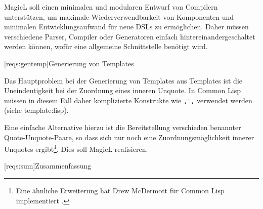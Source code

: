 \documentclass[12pt, a4paper, bibgerm]{scrbook}
\newcommand\icode[1]{\lstinline?#1?}
\newcommand\lsection{}
\newcommand\sref{}
\newcommand{\sees}[1]{(siehe \sref{#1})}
\begin{document}
MagicL soll einen minimalen und modularen Entwurf von Compilern
unterstützen, um maximale Wiederverwendbarkeit von Komponenten und
minimalen Entwicklungsaufwand für neue DSLs zu ermöglichen. Daher müssen
verschiedene Parser, Compiler oder Generatoren einfach
hintereinandergeschaltet werden können, wofür eine allgemeine
Schnittstelle benötigt wird.

\lsection[reqs:gentemp]{Generierung von Templates}

Das Hauptproblem bei der Generierung von Templates aus Templates ist die
Uneindeutigkeit bei der Zuordnung eines inneren Unquote. In Common Lisp
müssen in diesem Fall daher komplizierte Konstrukte wie \icode{,',}
verwendet werden \sees{template:lisp}. 

Eine einfache Alternative hierzu ist die Bereitstellung verschieden
benannter Quote-Unquote-Paare, so dass sich nur noch eine
Zuordnungsmöglichkeit innerer Unquotes ergibt\footnote{Eine ähnliche
  Erweiterung hat Drew McDermott für Common Lisp implementiert
  \cite[S.21ff]{YTools}.}. Dies soll MagicL realisieren.

\lsection[reqs:sum]{Zusammenfassung}
\end{document}

